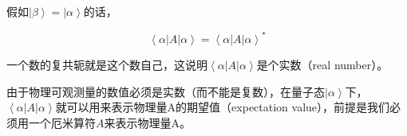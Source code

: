\begin{enumerate}
假如$\left| \beta \right\rangle = \left| \alpha \right\rangle$的话，

\begin{equation*}
\left\langle \alpha \right| A \left| \alpha \right\rangle = \left\langle \alpha \right| A \left| \alpha \right\rangle^*
\end{equation*}

一个数的复共轭就是这个数自己，这说明$\left\langle \alpha \right| A \left| \alpha \right\rangle$是个实数（real number）。

由于物理可观测量的数值必须是实数（而不能是复数），在量子态$\left| \alpha \right\rangle$下，$\left\langle \alpha \right| A \left| \alpha \right\rangle$就可以用来表示物理量A的期望值（expectation value），前提是我们必须用一个厄米算符$A$来表示物理量A。

\end{enumerate}